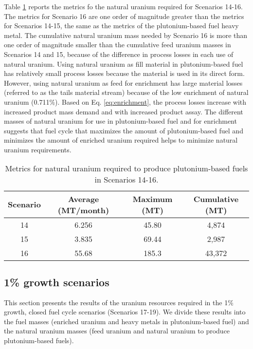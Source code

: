 Table \ref{tab:s14-16_natU} reports the metrics fo the natural uranium 
required for Scenarios 14-16. The metrics for Scenario 16 are one order 
of magnitude greater than the metrics for Scenarios 14-15, the same as 
the metrics of the plutonium-based fuel heavy metal. 
The cumulative natural uranium mass 
needed by Scenario 16 is more than one order of magnitude smaller than 
the cumulative feed uranium masses in Scenarios 14 and 15, because of the 
difference in process losses in each use of natural uranium. Using natural 
uranium as fill material in plutonium-based fuel has relatively small 
process losses because the material is used in its direct form. However, 
using natural uranium as feed for enrichment has large material losses 
(referred to as the tails material stream)
because of the low enrichment of natural uranium (0.711\%). Based on 
Eq. \ref{eq:enrichment}, the process losses increase with increased 
product mass demand and with increased product assay. The different 
masses of natural uranium for use in plutonium-based fuel and 
for enrichment suggests that fuel cycle that maximizes 
the amount of plutonium-based fuel and minimizes the amount of 
enriched uranium required helps to minimize natural uranium requirements. 

\begin{table}[h!]
    \centering 
    \caption{Metrics for natural uranium required to produce 
    plutonium-based fuels in Scenarios 14-16.}
    \label{tab:s14-16_natU}
    \begin{tabular}{c c c c}
        \hline 
        Scenario & Average (MT/month) & Maximum (MT) & Cumulative (MT) \\
        \hline 
        14 & 6.256 & 45.80 & 4,874 \\
        15 & 3.835 & 69.44 & 2,987 \\
        16 & 55.68 & 185.3 & 43,372 \\
        \hline
        
    \end{tabular}
\end{table}

\subsection{1\% growth scenarios}
This section presents the results of the uranium resources required 
in the 1\% growth, closed fuel cycle scenarios (Scenarios 17-19). 
We divide these results into the fuel masses (enriched uranium 
and heavy metals in plutonium-based fuel) and the natural 
uranium masses (feed uranium and natural uranium to produce 
plutonium-based fuels).

